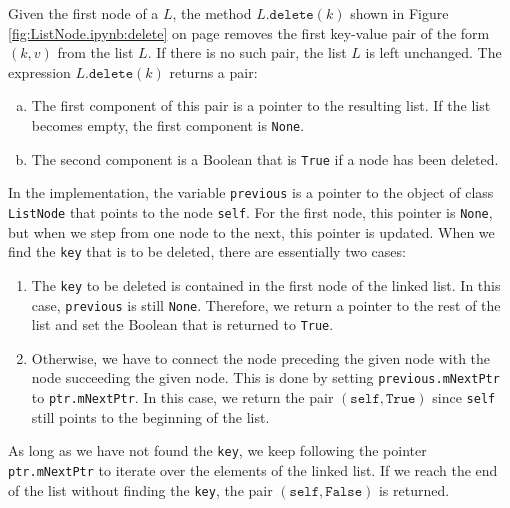 Given the first node of a  $L$, the method $L.\texttt{delete}(k)$ shown in Figure
\ref{fig:ListNode.ipynb:delete} on page \pageref{fig:ListNode.ipynb:delete} removes the first
key-value pair of the form $(k, v)$ from the list $L$.  If there is no such pair, the list $L$ is left unchanged.
The expression  $L.\texttt{delete}(k)$ returns a pair:
\begin{enumerate}[(a)]
\item The first component of this pair is a pointer to the resulting list.  If the list becomes empty, the
      first component is \texttt{None}.  
\item The second component is a Boolean that is \texttt{True} if a node has been deleted.
\end{enumerate}
In the implementation, the variable \texttt{previous} is a pointer to the object of class \texttt{ListNode}
that points to the node \texttt{self}.  For the first node, this pointer is \texttt{None}, but when we step
from one node to the next, this pointer is updated.  When we find the \texttt{key} that is to be deleted, there are
essentially two cases:
\begin{enumerate}
\item The \texttt{key} to be deleted is contained in the first node of the linked list.  In this case, \texttt{previous}
      is still \texttt{None}.  Therefore, we return a pointer to the rest of the list and set the Boolean
      that is returned to \texttt{True}.
\item Otherwise, we have to connect the node preceding the given node with the node succeeding the given node.
      This is done by setting \texttt{previous.mNextPtr} to \texttt{ptr.mNextPtr}.
      In this case, we return the pair $(\mathtt{self}, \mathtt{True})$ since \texttt{self} still points to the
      beginning of the list.
\end{enumerate}
As long as we have not found the \texttt{key}, we keep following the pointer \texttt{ptr.mNextPtr} to iterate over the
elements of the linked list.  If we reach the end of the list without finding the \texttt{key}, the pair
$(\mathtt{self}, \mathtt{False})$ is returned.


